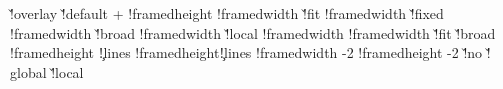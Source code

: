 {     \boxhasstrutfalse
     \boxisoverlaidfalse
     \@@localoffset{}
   \else\ifx\localoffset\v!overlay
     \boxhasoffsetfalse
     \boxhasstrutfalse
     \boxisoverlaidtrue
     \@@localoffset\zeropoint
   \else
     \boxhasoffsettrue
     \boxhasstruttrue
     \boxisoverlaidfalse
     \ifx\localoffset\v!default %
       \let\localoffset\defaultframeoffset
     \else
       \let{}\localoffset
     \fi
     \@@localoffset\dimexpr\localoffset+\relax
   \fi\fi
   \!!framedheight\zeropoint
   \!!framedwidth \zeropoint
   \ifx\localwidth\v!fit
     \ifboxhasformat
       \boxhaswidthtrue
       \!!framedwidth\hsize
     \else
       \boxhaswidthfalse
     \fi
   \else\ifx\localwidth\v!fixed %
     \ifboxhasformat
       \boxhaswidthtrue
       \!!framedwidth\hsize
     \else
       \boxhaswidthfalse
     \fi
   \else\ifx\localwidth\v!broad
     \boxhaswidthtrue
     \!!framedwidth\hsize
   \else\ifx\localwidth\v!local
     \boxhaswidthtrue
     \setlocalhsize
     \!!framedwidth\localhsize
   \else
     \boxhaswidthtrue
     \!!framedwidth\localwidth
   \fi\fi\fi\fi
   \ifx\localheight\v!fit
     \boxhasheightfalse %
   \else\ifx\localheight\v!broad
     \boxhasheightfalse
   \else
     \boxhasheighttrue
     \!!framedheight\localheight
   \fi\fi
   \ifboxhasheight
   \else
       {\ifcase\framedparameter\c!lines\else
          \!!framedheight\framedparameter\c!lines\lineheight
          \edef\localheight{\the\!!framedheight}%
          \boxhasheighttrue
        \fi}%
   \fi
   \advance\!!framedwidth  -2\@@localoffset
   \advance\!!framedheight -2\@@localoffset
   \ifx\localstrut\v!no
     \boxhasstrutfalse
   \else\ifx\localstrut\v!global
     \setstrut
   \else\ifx\localstrut\v!local
     \setfontstrut
   \else
     \setstrut
   \fi\fi\fi
   \ifboxhasstrut
     \let\localbegstrut\begstrut
     \let\localendstrut\endstrut
     \let\localstrut   \strut
   \else
     \let\localbegstrut\pseudobegstrut %
     \let\localendstrut\pseudoendstrut %
     \let\localstrut   \pseudostrut    %
}

